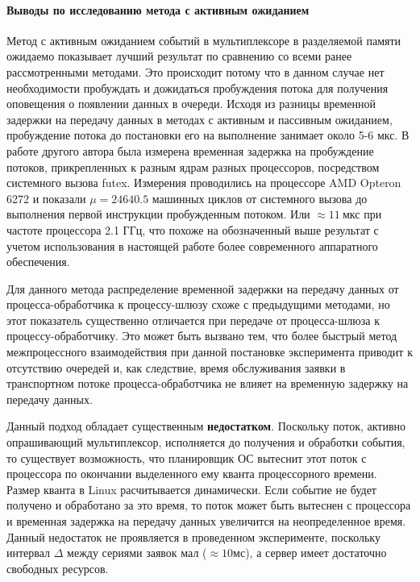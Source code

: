 \paragraph{Выводы по исследованию метода с активным ожиданием}

Метод с активным ожиданием событий в мультиплексоре в разделяемой памяти ожидаемо показывает лучший результат по сравнению со всеми ранее рассмотренными методами. Это происходит потому что в данном случае нет необходимости пробуждать и дожидаться пробуждения потока для получения оповещения о появлении данных в очереди. Исходя из разницы временной задержки на передачу данных в методах с активным и пассивным ожиданием, пробуждение потока до постановки его на выполнение занимает около 5-6 мкс.
В работе другого автора \cite{8526899} была измерена временная задержка на пробуждение потоков, прикрепленных к разным ядрам разных процессоров, посредством системного вызова futex. Измерения проводились на процессоре AMD Opteron 6272 и показали $\mu = 24640.5$ машинных циклов от системного вызова до выполнения первой инструкции пробужденным потоком. Или $\approx 11 ~\text{мкс}$ при частоте процессора 2.1 ГГц, что похоже на обозначенный выше результат с учетом использования в настоящей работе более современного аппаратного обеспечения.

Для данного метода распределение временной задержки на передачу данных от процесса-обработчика к процессу-шлюзу схоже с предыдущими методами, но этот показатель существенно отличается при передаче от процесса-шлюза к процессу-обработчику. Это может быть вызвано тем, что более быстрый метод межпроцессного взаимодействия при данной постановке эксперимента приводит к отсутствию очередей и, как следствие, время обслуживания заявки в транспортном потоке процесса-обработчика не влияет на временную задержку на передачу данных.

Данный подход обладает существенным \textbf{недостатком}. Поскольку поток, активно опрашивающий мультиплексор, исполняется до получения и обработки события, то существует возможность, что планировщик ОС вытеснит этот поток с процессора по окончании выделенного ему кванта процессорного времени. Размер кванта в Linux расчитывается динамически. Если событие не будет получено и обработано за это время, то поток может быть вытеснен с процессора и временная задержка на передачу данных увеличится на неопределенное время. Данный недостаток не проявляется в проведенном эксперименте, поскольку интервал $\Delta$ между сериями заявок мал ($\approx 10 \text{мс}$), а сервер имеет достаточно свободных ресурсов.

